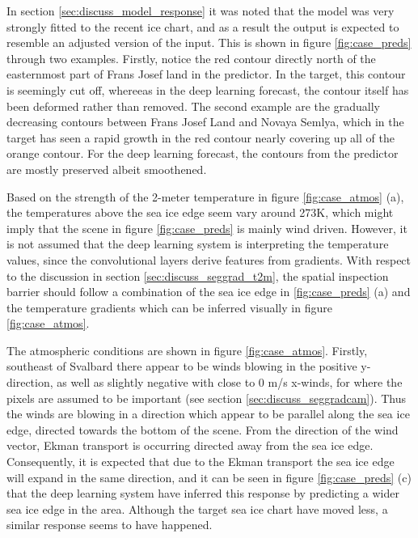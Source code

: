 \documentclass[../main/thesis]{subfiles}
\begin{document}
In section \ref{sec:discuss_model_response} it was noted that the model was very strongly fitted to the recent ice chart, and as a result the output is expected to resemble an adjusted version of the input. This is shown in figure \ref{fig:case_preds} through two examples. Firstly, notice the red contour directly north of the easternmost part of Frans Josef land in the predictor. In the target, this contour is seemingly cut off, whereeas in the deep learning forecast, the contour itself has been deformed rather than removed. The second example are the gradually decreasing contours between Frans Josef Land and Novaya Semlya, which in the target has seen a rapid growth in the red contour nearly covering up all of the orange contour. For the deep learning forecast, the contours from the predictor are mostly preserved albeit smoothened.

Based on the strength of the 2-meter temperature in figure \ref{fig:case_atmos} (a), the temperatures above the sea ice edge seem vary around 273K, which might imply that the scene in figure \ref{fig:case_preds} is mainly wind driven. However, it is not assumed that the deep learning system is interpreting the temperature values, since the convolutional layers derive features from gradients. With respect to the discussion in section \ref{sec:discuss_seggrad_t2m}, the spatial inspection barrier should follow a combination of the sea ice edge in \ref{fig:case_preds} (a) and the temperature gradients which can be inferred visually in figure \ref{fig:case_atmos}.

The atmospheric conditions are shown in figure \ref{fig:case_atmos}. Firstly, southeast of Svalbard there appear to be winds blowing in the positive y-direction, as well as slightly negative with close to 0 m/s x-winds, for where the pixels are assumed to be important (see section \ref{sec:discuss_seggradcam}). Thus the winds are blowing in a direction which appear to be parallel along the sea ice edge, directed towards the bottom of the scene. From the direction of the wind vector, Ekman transport is occurring directed away from the sea ice edge. Consequently, it is expected that due to the Ekman transport the sea ice edge will expand in the same direction, and it can be seen in figure \ref{fig:case_preds} (c) that the deep learning system have inferred this response by predicting a wider sea ice edge in the area. Although the target sea ice chart have moved less, a similar response seems to have happened. 
\end{document}
